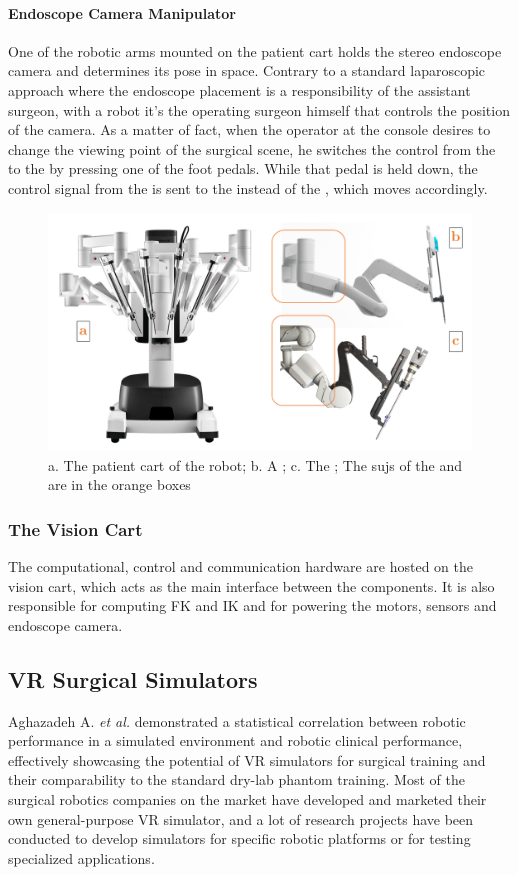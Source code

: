 \documentclass[../main.tex]{subfiles}
\begin{document}
\paragraph{Endoscope Camera Manipulator} One of the robotic arms mounted on the patient cart holds the stereo endoscope camera and determines its pose in space. Contrary to a standard laparoscopic approach where the endoscope placement is a responsibility of the assistant surgeon, with a \davinci robot it's the operating surgeon himself that controls the position of the camera. As a matter of fact, when the operator at the console desires to change the viewing point of the surgical scene, he switches the control from the \psms to the \ecm by pressing one of the foot pedals. While that pedal is held down, the control signal from the \mtms is sent to the \ecm instead of the \psms, which moves accordingly.

\begin{figure}[h]
    \centering
    \includegraphics[width=\textwidth]{images/patient_cart_panel.png}
    \caption{a. The patient cart of the \davinci robot; b. A \psm; c. The \ecm; The \acp{suj} of the \psm and \ecm are in the orange boxes}
    \label{fig:patientcartpanel}
\end{figure}

\subsubsection{The Vision Cart} 
The computational, control and communication hardware are hosted on the vision cart, which acts as the main interface between the components. It is also responsible for computing FK and IK and for powering the motors, sensors and endoscope camera.

\subsection{VR Surgical Simulators}
Aghazadeh A. \textit{et al.} \cite{Aghazadeh2016} demonstrated a statistical correlation between robotic performance in a simulated environment and robotic clinical performance, effectively showcasing the potential of VR simulators for surgical training and their comparability to the standard dry-lab phantom training. Most of the surgical robotics companies on the market have developed and marketed their own general-purpose VR simulator, and a lot of research projects have been conducted to develop simulators for specific robotic platforms or for testing specialized applications.
\end{document}
